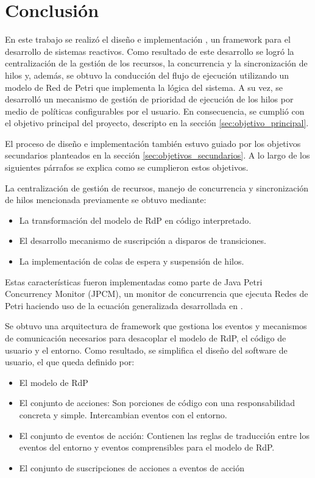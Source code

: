 \section{Conclusión}

En este trabajo se realizó el diseño e implementación
\textit{\nombreFramework}, un framework para el desarrollo de sistemas
reactivos. Como resultado de este desarrollo se logró la centralización de la
gestión de los recursos, la concurrencia y la sincronización de hilos y,
además, se obtuvo la conducción del flujo de ejecución utilizando un modelo de
Red de Petri que implementa la lógica del sistema. A su vez, se desarrolló un
mecanismo de gestión de prioridad de ejecución de los hilos por medio de
políticas configurables por el usuario. En consecuencia, se cumplió con
el objetivo principal del proyecto, descripto en la sección
\ref{sec:objetivo_principal}.

El proceso de diseño e implementación también estuvo guiado por los objetivos
secundarios planteados en la sección \ref{sec:objetivos_secundarios}. A lo largo
de los siguientes párrafos se explica como se cumplieron estos objetivos.

La centralización de gestión de recursos, manejo de
concurrencia y sincronización de hilos mencionada previamente se obtuvo
mediante:
\begin{itemize}
 \item La transformación del modelo de RdP en código interpretado.

 \item El desarrollo mecanismo de suscripción a disparos de transiciones.

 \item La implementación de colas de espera y suspensión de hilos.
\end{itemize}

Estas características fueron implementadas como parte de Java Petri Concurrency
 Monitor (JPCM), un monitor de concurrencia que ejecuta Redes de Petri haciendo
 uso de la ecuación generalizada desarrollada en
 \cite{Ecuacion_generalizada_LAC}.

Se obtuvo una arquitectura de framework que gestiona los eventos y mecanismos
de comunicación necesarios para desacoplar el modelo de RdP, el código de
usuario y el entorno.
Como resultado, se simplifica el diseño del software de usuario, el que queda
definido por:

\begin{itemize}
    \item El modelo de RdP
    \item El conjunto de acciones: Son porciones de código con una
    responsabilidad concreta y simple. Intercambian eventos con el entorno.
    \item El conjunto de eventos de acción: Contienen las reglas de traducción
    entre los eventos del entorno y eventos comprensibles para el modelo de
    RdP.
    \item El conjunto de suscripciones de acciones a eventos de acción
\end{itemize}

